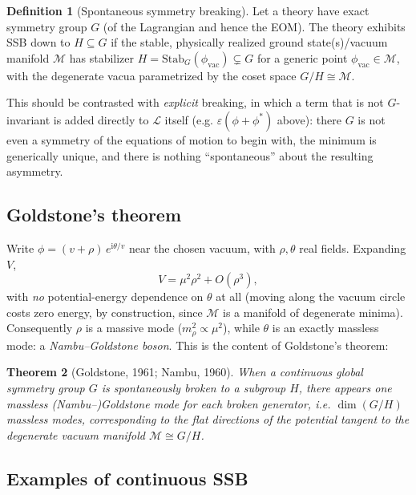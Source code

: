\documentclass[11pt]{article}
\newtheorem{theorem}{Theorem}[section]
\theoremstyle{definition}
\newtheorem{definition}[theorem]{Definition}
\theoremstyle{remark}
\newcommand{\ii}{\mathrm{i}}
\newcommand{\Lag}{\mathcal{L}}
\newcommand{\eps}{\varepsilon}
\newcommand{\Stab}{\mathrm{Stab}}
\begin{document}
\begin{definition}[Spontaneous symmetry breaking]
Let a theory have exact symmetry group $G$ (of the Lagrangian and hence the EOM). The theory exhibits SSB down to $H\subseteq G$ if the stable, physically realized ground state(s)/vacuum manifold $\mathcal M$ has stabilizer $H = \Stab_G(\phi_{\text{vac}}) \subsetneq G$ for a generic point $\phi_{\text{vac}}\in\mathcal M$, with the degenerate vacua parametrized by the coset space $G/H \cong \mathcal M$.
\end{definition}

This should be contrasted with \emph{explicit} breaking, in which a term that is not $G$-invariant is added directly to $\Lag$ itself (e.g. $\eps(\phi+\phi^*)$ above): there $G$ is not even a symmetry of the equations of motion to begin with, the minimum is generically unique, and there is nothing ``spontaneous'' about the resulting asymmetry.

\subsection{Goldstone's theorem}

Write $\phi = (v+\rho)\,e^{\ii\theta/v}$ near the chosen vacuum, with $\rho,\theta$ real fields. Expanding $V$,
\[
V = \mu^2\rho^2 + O(\rho^3), 
\]
with \emph{no} potential-energy dependence on $\theta$ at all (moving along the vacuum circle costs zero energy, by construction, since $\mathcal M$ is a manifold of degenerate minima). Consequently $\rho$ is a massive mode ($m_\rho^2\propto\mu^2$), while $\theta$ is an exactly massless mode: a \emph{Nambu--Goldstone boson}. This is the content of Goldstone's theorem:

\begin{theorem}[Goldstone, 1961; Nambu, 1960]
When a continuous global symmetry group $G$ is spontaneously broken to a subgroup $H$, there appears one massless (Nambu--)Goldstone mode for each broken generator, i.e. $\dim(G/H)$ massless modes, corresponding to the flat directions of the potential tangent to the degenerate vacuum manifold $\mathcal M \cong G/H$.
\end{theorem}

\subsection{Examples of continuous SSB}
\end{document}
